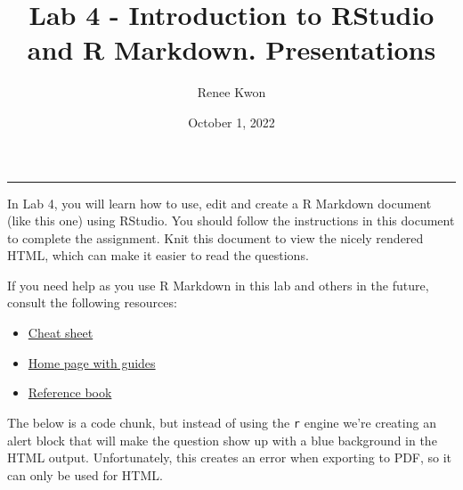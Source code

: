 \documentclass[
]{article}
\title{Lab 4 - Introduction to RStudio and R Markdown. Presentations}
\author{Renee Kwon}
\date{October 1, 2022}
\providecommand{\tightlist}{%
  \setlength{\itemsep}{0pt}\setlength{\parskip}{0pt}}
\begin{document}
\maketitle

{
\setcounter{tocdepth}{2}
\tableofcontents
}
\begin{center}\rule{0.5\linewidth}{0.5pt}\end{center}

In Lab 4, you will learn how to use, edit and create a R Markdown
document (like this one) using RStudio. You should follow the
instructions in this document to complete the assignment. Knit this
document to view the nicely rendered HTML, which can make it easier to
read the questions.

If you need help as you use R Markdown in this lab and others in the
future, consult the following resources:

\begin{itemize}
\tightlist
\item
  \href{https://rmarkdown.rstudio.com/lesson-15.html}{Cheat sheet}
\item
  \href{https://rmarkdown.rstudio.com/docs/}{Home page with guides}
\item
  \href{https://bookdown.org/yihui/rmarkdown/}{Reference book}
\end{itemize}

The below is a code chunk, but instead of using the \texttt{r} engine
we're creating an alert block that will make the question show up with a
blue background in the HTML output. Unfortunately, this creates an error
when exporting to PDF, so it can only be used for HTML.
\end{document}
